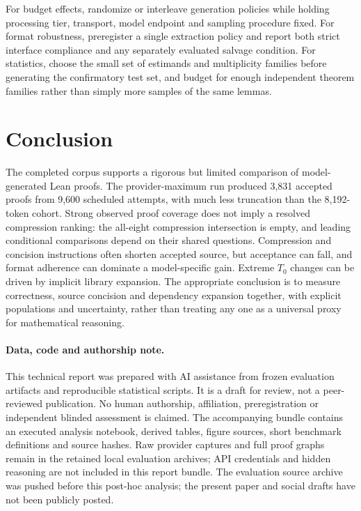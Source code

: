 \documentclass[11pt]{article}
\begin{document}
For budget effects, randomize or interleave generation policies while holding processing tier, transport, model endpoint and sampling procedure fixed. For format robustness, preregister a single extraction policy and report both strict interface compliance and any separately evaluated salvage condition. For statistics, choose the small set of estimands and multiplicity families before generating the confirmatory test set, and budget for enough independent theorem families rather than simply more samples of the same lemmas.

\section{Conclusion}
The completed corpus supports a rigorous but limited comparison of model-generated Lean proofs. The provider-maximum run produced 3,831 accepted proofs from 9,600 scheduled attempts, with much less truncation than the 8,192-token cohort. Strong observed proof coverage does not imply a resolved compression ranking: the all-eight compression intersection is empty, and leading conditional comparisons depend on their shared questions. Compression and concision instructions often shorten accepted source, but acceptance can fall, and format adherence can dominate a model-specific gain. Extreme $T_0$ changes can be driven by implicit library expansion. The appropriate conclusion is to measure correctness, source concision and dependency expansion together, with explicit populations and uncertainty, rather than treating any one as a universal proxy for mathematical reasoning.

\paragraph{Data, code and authorship note.}
This technical report was prepared with AI assistance from frozen evaluation artifacts and reproducible statistical scripts. It is a draft for review, not a peer-reviewed publication. No human authorship, affiliation, preregistration or independent blinded assessment is claimed. The accompanying bundle contains an executed analysis notebook, derived tables, figure sources, short benchmark definitions and source hashes. Raw provider captures and full proof graphs remain in the retained local evaluation archives; API credentials and hidden reasoning are not included in this report bundle. The evaluation source archive was pushed before this post-hoc analysis; the present paper and social drafts have not been publicly posted.
\end{document}
